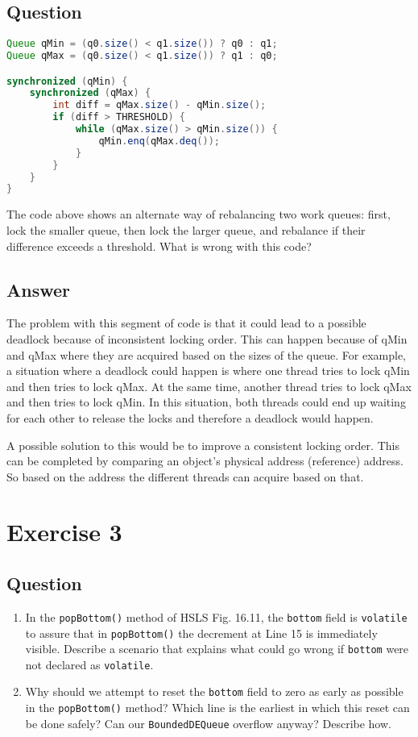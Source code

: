 \documentclass{article}
\begin{document}
\subsection*{Question}
\begin{lstlisting}[language=Java]
Queue qMin = (q0.size() < q1.size()) ? q0 : q1;
Queue qMax = (q0.size() < q1.size()) ? q1 : q0;

synchronized (qMin) {
    synchronized (qMax) {
        int diff = qMax.size() - qMin.size();
        if (diff > THRESHOLD) {
            while (qMax.size() > qMin.size()) {
                qMin.enq(qMax.deq());
            }
        }
    }
}
\end{lstlisting}

The code above shows an alternate way of rebalancing two work queues: first, lock the smaller queue, then lock the larger queue, and rebalance if their difference exceeds a threshold. What is wrong with this code?


\subsection*{Answer}
The problem with this segment of code is that it could lead to a possible deadlock because of inconsistent locking order. This can happen because of qMin and qMax where they are acquired based on the sizes of the queue. For example, a situation where a deadlock could happen is where one thread tries to lock qMin and then tries to lock qMax. At the same time, another thread tries to lock qMax and then tries to lock qMin. In this situation, both threads could end up waiting for each other to release the locks and therefore a deadlock would happen.

A possible solution to this would be to improve a consistent locking order. This can be completed by comparing an object's physical address (reference) address. So based on the address the different threads can acquire based on that.






\section*{Exercise 3}
\subsection*{Question}
\begin{enumerate}
    \item In the \texttt{popBottom()} method of HSLS Fig. 16.11, the \texttt{bottom} field is \texttt{volatile} to assure that in \texttt{popBottom()} the decrement at Line 15 is immediately visible. Describe a scenario that explains what could go wrong if \texttt{bottom} were not declared as \texttt{volatile}.
    
    \item Why should we attempt to reset the \texttt{bottom} field to zero as early as possible in the \texttt{popBottom()} method? Which line is the earliest in which this reset can be done safely? Can our \texttt{BoundedDEQueue} overflow anyway? Describe how.
\end{enumerate}
\end{document}
